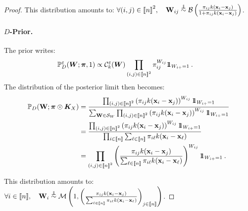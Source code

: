 \begin{proof}
This distribution amounts to: $\forall (i,j) \in {[\![n]\!]}^2, \quad \mathbf{W}_{ij} \stackrel{\perp\!\!\!\!\perp}{\sim} \mathcal{B}\left( \frac{\pi_{ij} k(\mathbf{x}_i - \mathbf{x}_j)}{1+\pi_{ij} k(\mathbf{x}_i - \mathbf{x}_j)} \right)$.

\paragraph{$D$-Prior.} The prior writes:
\begin{align*}
    \mathbb{P}_{D}^{\varepsilon}(\bm{W}; \bm{\pi}, 1) &\propto \mathcal{C}_{k}^{\varepsilon}(\bm{W}) \prod_{(i,j) \in {[\![n]\!]}^2} \pi_{ij}^{W_{ij}} 1\!\!1_{W_{i+} = 1} \:.
\end{align*}
The distribution of the posterior limit then becomes:
\begin{align*}
    \mathbb{P}_{D}(\W ;\bm{\pi} \odot \bm{K}_{X}) &= \frac{\prod_{(i,j) \in \integ{n}^2}  \left(\pi_{ij} k(\mathbf{x}_i - \mathbf{x}_j)\right)^{W_{ij}} \ind_{W_{i+} = 1}}{\sum_{\W \in \mathcal{S}_{W}} \prod_{(i,j) \in \integ{n}^2}  \left(\pi_{ij} k(\mathbf{x}_i - \mathbf{x}_j)\right)^{W_{ij}} \ind_{W_{i+} = 1}} \\
    &= \frac{\prod_{(i,j) \in \integ{n}^2}  \left(\pi_{ij} k(\mathbf{x}_i - \mathbf{x}_j)\right)^{W_{ij}} \ind_{W_{i+} = 1}}{\prod_{i \in \integ{n}} \sum_{\ell \in \integ{n}} \pi_{i\ell} k(\mathbf{x}_i - \mathbf{x}_{\ell})} \\
    &= \prod_{(i,j) \in \integ{n}^2} \left(\frac{\pi_{ij} k(\mathbf{x}_i - \mathbf{x}_j)}{\sum_{\ell \in \integ{n}} \pi_{i\ell} k(\mathbf{x}_i - \mathbf{x}_{\ell})}\right)^{W_{ij}} \ind_{W_{i+} = 1} \:.
\end{align*}

This distribution amounts to: $\forall i \in \integ{n}, \quad \W_{i} \stackrel{\perp\!\!\!\!\perp}{\sim} \mathcal{M}\left(1, \left(\frac{\pi_{ij} k(\mathbf{x}_i - \mathbf{x}_j)}{\sum_{\ell \in \integ{n}} \pi_{i\ell} k(\mathbf{x}_i - \mathbf{x}_{\ell})}\right)_{j \in \integ{n}}\right)$.


\end{proof}
